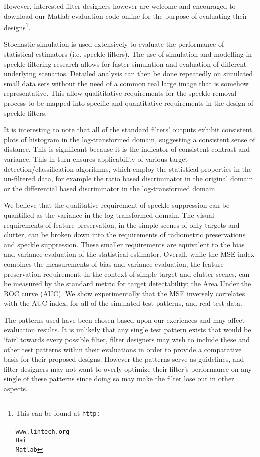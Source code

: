 \documentclass[journal]{IEEEtran}
\begin{document}
However, interested filter designers however are welcome and encouraged to download our Matlab evaluation code online for the purpose of evaluating their designs\footnote{This can be found at \texttt{http:\\\\www.lintech.org\\Hai\\Matlab}}.

Stochastic simulation is used extensively to evaluate the performance of statistical estimators (i.e. speckle filters).
The use of simulation and modelling in speckle filtering research allows for faster simulation and evaluation of different underlying scenarios. 
Detailed analysis can then be done repeatedly on simulated small data sets without the need of a common real large image that is somehow representative. This allow qualititative requirements for the speckle removal process to be mapped into specific and quantitative requirements in the design of speckle filters. 

It is interesting to note that all of the standard filters' outputs exhibit consistent plots of histogram in the log-transformed domain, suggesting a consistent sense of distance. 
This is significant because it is the indicator of consistent contrast and variance.
This in turn ensures applicability of various target detection/classification algorithms, which employ the statistical properties in the un-filtered data, for example the ratio based discriminator in the original domain or the differential based discriminator in the log-transformed domain.

We believe that the qualitative requirement of speckle suppression can be quantified as the variance in the log-transformed domain. 
The visual requirements of feature preservation, in the simple scenes of only targets and clutter, can be broken down into the requirements of radiometric preservations and speckle suppression.
These smaller requirements are equivalent to the bias and variance evaluation of the statistical estimator.
Overall, while the MSE index combines the measurements of bias and variance evaluation, 
	the feature preservation requirement, in the context of simple target and clutter scenes, can be measured by the standard metric for target detectability: the Area Under the ROC curve (AUC).
We show experimentally that the MSE inversely correlates with the AUC index, for all of the simulated test patterns, and real test data.

The patterns used have been chosen based upon our exeriences and may affect evaluation results. It is unlikely that any single test pattern exists that would be `fair' towards every possible filter, filter designers may wish to include these and other test patterns within their evaluations in order to provide a comparative basis for their proposed designs.
However the patterns serve as guidelines, and filter designers may not want to overly optimize their filter's performance on any single of these patterns since doing so may make the filter lose out in other aspects.
\end{document}
